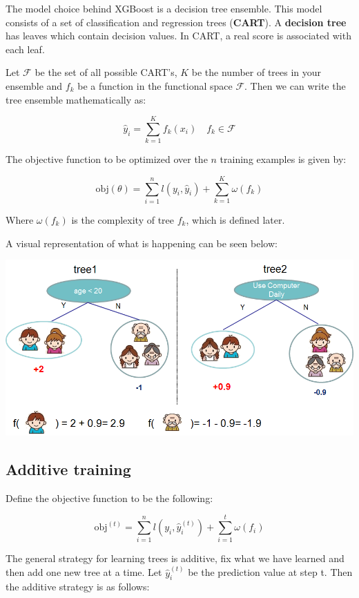 \documentclass[12 pt, leqno]{article}
\begin{document}
The model choice behind XGBoost is a decision tree ensemble. This model consists of a set of classification and regression trees (\textbf{CART}). A \textbf{decision tree} has leaves which contain decision values. In CART, a real score is associated with each leaf.

Let $\mathcal{F}$ be the set of all possible CART's, $K$ be the number of trees in your ensemble and $f_k$ be a function in the functional space $\mathcal{F}$. Then we can write the tree ensemble mathematically as:

$$\hat{y}_i = \sum_{k = 1}^{K} f_k(x_i)  \quad f_k \in \mathcal{F} $$

The objective function to be optimized over the $n$ training examples is given by:

$$ \text{obj}(\theta) = \sum_{i = 1} ^n l(y_i, \hat{y}_i) + \sum_{k = 1}^K \omega(f_k) $$

Where $\omega(f_k)$ is the complexity of tree $f_k$, which is defined later.

A visual representation of what is happening can be seen below:

\includegraphics[scale=0.75]{tree_ensemble_example}

\subsection{Additive training}

Define the objective function to be the following:

$$ \text{obj}^{(t)} = \sum_{i = 1} ^n l(y_i, \hat{y}^{(t)}_i) + \sum_{i = 1}^t \omega(f_i)  $$

The general strategy for learning trees is additive, fix what we have learned and then add one new tree at a time. Let $\hat{y}^{(t)}_i$ be the prediction value at step t. Then the additive strategy is as follows:
\end{document}
